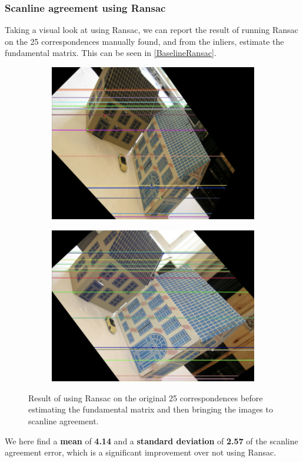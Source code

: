 \subsubsection{Scanline agreement using Ransac}
Taking a visual look at using Ransac, we can report the result of running Ransac on the 25 correspondences manually found, and from the inliers, estimate the fundamental matrix. This can be seen in \autoref{BaselineRansac}.
\begin{figure}[h]
	\centering
	\begin{subfigure}{0.48\linewidth}
		\centering
		\includegraphics[width=\linewidth]{Materials/BaselineARansac}
	\end{subfigure}
	\begin{subfigure}{0.48\linewidth}
		\centering
		\includegraphics[width=\linewidth]{Materials/BaselineBRansac}
	\end{subfigure}
	\caption{Result of using Ransac on the original 25 correspondences before estimating the fundamental matrix and then bringing the images to scanline agreement.}
	\label{BaselineRansac}
\end{figure}
We here find a \textbf{mean} of \textbf{4.14} and a \textbf{standard deviation} of \textbf{2.57} of the scanline agreement error, which is a significant improvement over not using Ransac.